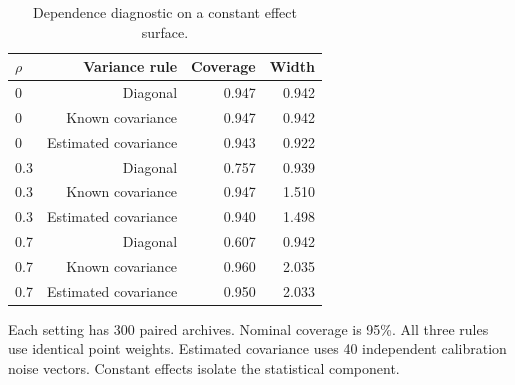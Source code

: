 \begin{table}[htbp]
\centering\small
\setlength{\tabcolsep}{4pt}
\caption{Dependence diagnostic on a constant effect surface.}
\label{tab:b-dependence}
\begin{tabular}{lrrr}
\toprule
$\rho$ & Variance rule & Coverage & Width \\
\midrule
0 & Diagonal & 0.947 & 0.942 \\
0 & Known covariance & 0.947 & 0.942 \\
0 & Estimated covariance & 0.943 & 0.922 \\
0.3 & Diagonal & 0.757 & 0.939 \\
0.3 & Known covariance & 0.947 & 1.510 \\
0.3 & Estimated covariance & 0.940 & 1.498 \\
0.7 & Diagonal & 0.607 & 0.942 \\
0.7 & Known covariance & 0.960 & 2.035 \\
0.7 & Estimated covariance & 0.950 & 2.033 \\
\bottomrule
\end{tabular}
\par\smallskip\begin{minipage}{0.97\linewidth}\footnotesize Each setting has 300 paired archives. Nominal coverage is 95\%. All three rules use identical point weights. Estimated covariance uses 40 independent calibration noise vectors. Constant effects isolate the statistical component.\end{minipage}
\end{table}
